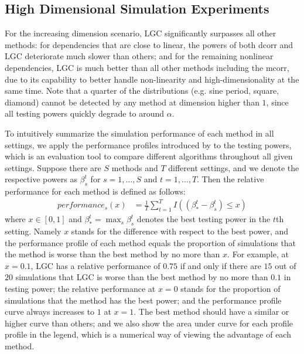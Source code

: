 \documentclass[11pt]{article}
\begin{document}
\subsection{High Dimensional Simulation Experiments}
\label{numer1}


For the increasing dimension scenario, LGC significantly surpasses all other methods: for dependencies that are close to linear, the powers of both dcorr and LGC deteriorate much slower than others; and for the remaining nonlinear dependencies, LGC is much better than all other methods including the mcorr, due to its capability to better handle non-linearity and high-dimensionality at the same time. Note that a quarter of the distributions (e.g. sine period, square, diamond) cannot be detected by any method at dimension higher than $1$, since all testing powers quickly degrade to around $\alpha$.

To intuitively summarize the simulation performance of each method in all settings, we apply the performance profiles introduced by \cite{DolanMore2002} to the testing powers, which is an evaluation tool to compare different algorithms throughout all given settings. Suppose there are $S$ methods and $T$ different settings, and we denote the respective powers as $\beta_{s}^{t}$ for $s=1,\ldots,S$ and $t=1,\ldots,T$. Then the relative performance for each method is defined as follows:
\begin{align*}
performance_{s}(x) &= \frac{1}{T} \sum_{t=1}^{T} I((\beta_{*}^{t}-\beta_{s}^{t}) \leq x)
\end{align*}
where $x \in [0,1]$ and $\beta_{*}^{t} =\max_{s} \beta_{s}^{t}$ denotes the best testing power in the $t$th setting. Namely $x$ stands for the difference with respect to the best power, and the performance profile of each method equals the proportion of simulations that the method is worse than the best method by no more than $x$. For example, at $x=0.1$, LGC has a relative performance of $0.75$ if and only if there are $15$ out of $20$ simulations that LGC is worse than the best method by no more than $0.1$ in testing power; the relative performance at $x=0$ stands for the proportion of simulations that the method has the best power; and the performance profile curve always increases to $1$ at $x=1$. The best method should have a similar or higher curve than others; and we also show the area under curve for each profile profile in the legend, which is a numerical way of viewing the advantage of each method.
\end{document}
